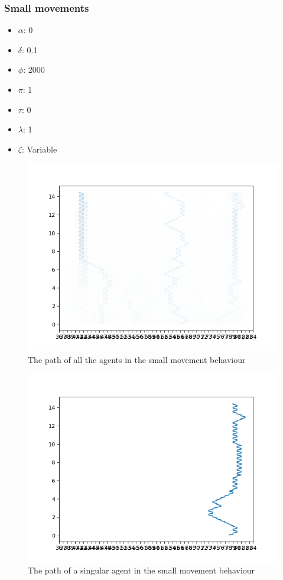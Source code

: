 \documentclass[a4paper,english]{report}
\begin{document}
	
	\subsubsection{Small movements}
	\begin{samepage}\begin{itemize}
		\item $\alpha$: 0
		\item $\delta$: 0.1
		\item $\phi$: 2000
		\item $\pi$: 1
		\item $\tau$: 0
		\item $\lambda$: 1
		\item $\zeta$: Variable
	\end{itemize}\end{samepage}
	\begin{figure}
		\centering
		\includegraphics[width=1\linewidth]{smallMovements}
		\caption{The path of all the agents in the small movement behaviour}
		\label{fig:small}
	\end{figure}
	\begin{figure}
		\centering
		\includegraphics[width=1\linewidth]{smallMovementsOneAgent}
		\caption{The path of a singular agent in the small movement behaviour}
		\label{fig:smallOne}
	\end{figure}
\end{document}
